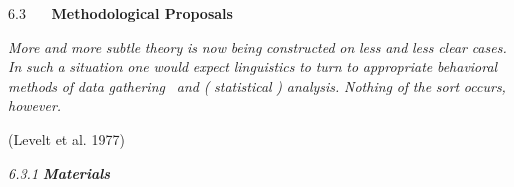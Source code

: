 \begin{styleStandard}
6.3 \ \ \ \textbf{Methodological Proposals}
\end{styleStandard}


\begin{styleStandard}
\textit{More}\textit{ }\textit{and}\textit{ }\textit{more}\textit{ }\textit{subtle}\textit{ }\textit{theory}\textit{ }\textit{is}\textit{ }\textit{now}\textit{ }\textit{being}\textit{ }\textit{constructed}\textit{ }\textit{on}\textit{ }\textit{less}\textit{ }\textit{and}\textit{ }\textit{less}\textit{ }\textit{clear}\textit{ }\textit{cases.}\textit{ }\textit{In}\textit{ }\textit{such}\textit{ }\textit{a}\textit{ }\textit{situation}\textit{ }\textit{one}\textit{ }\textit{would}\textit{ }\textit{expect}\textit{ }\textit{linguistics}\textit{ }\textit{to}\textit{ }\textit{turn}\textit{ }\textit{to}\textit{ }\textit{appropriate}\textit{ }\textit{behavioral}\textit{ }\textit{methods}\textit{ }\textit{of}\textit{ }\textit{data}\textit{ }\textit{gathering }\textit{\ }\textit{and}\textit{ }\textit{(}\textit{ }\textit{statistical}\textit{ }\textit{)}\textit{ }\textit{analysis.}\textit{ }\textit{Nothing}\textit{ }\textit{of}\textit{ }\textit{the}\textit{ }\textit{sort}\textit{ }\textit{occurs,}\textit{ }\textit{however.}
\end{styleStandard}


\begin{styleStandard}
(Levelt et al. 1977)
\end{styleStandard}


\clearpage\setcounter{page}{1}\begin{styleStandard}
\textit{6.3.1}\textit{ }\textbf{\textit{Materials}}
\end{styleStandard}


